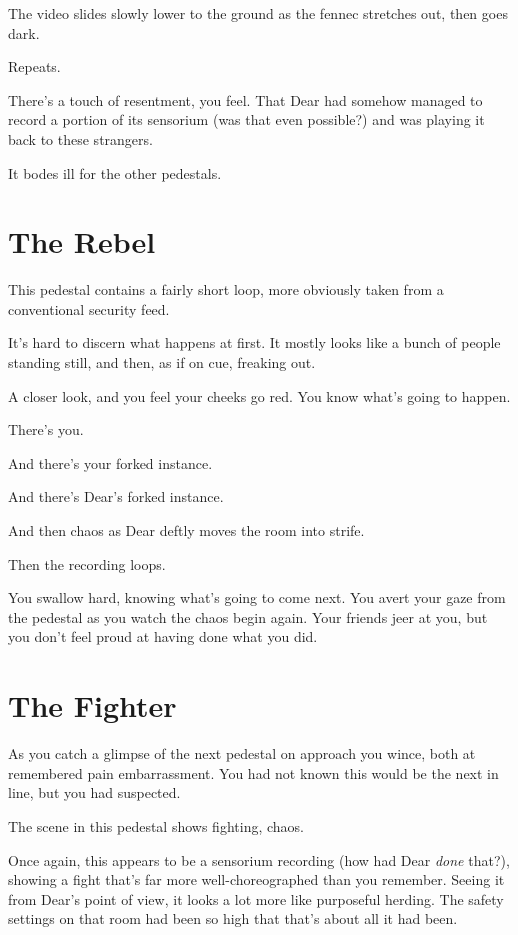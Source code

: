 The video slides slowly lower to the ground as the fennec stretches out, then goes dark.

Repeats.

There's a touch of resentment, you feel. That Dear had somehow managed to record a portion of its sensorium (was that even possible?) and was playing it back to these strangers.

It bodes ill for the other pedestals.

\newpage
\section*{The Rebel}

This pedestal contains a fairly short loop, more obviously taken from a conventional security feed.

It's hard to discern what happens at first. It mostly looks like a bunch of people standing still, and then, as if on cue, freaking out.

A closer look, and you feel your cheeks go red. You know what's going to happen.

There's you.

And there's your forked instance.

And there's Dear's forked instance.

And then chaos as Dear deftly moves the room into strife.

Then the recording loops.

You swallow hard, knowing what's going to come next. You avert your gaze from the pedestal as you watch the chaos begin again. Your friends jeer at you, but you don't feel proud at having done what you did.

\newpage
\section*{The Fighter}

As you catch a glimpse of the next pedestal on approach you wince, both at remembered pain embarrassment. You had not known this would be the next in line, but you had suspected.

The scene in this pedestal shows fighting, chaos.

Once again, this appears to be a sensorium recording (how had Dear \emph{done} that?), showing a fight that's far more well-choreographed than you remember. Seeing it from Dear's point of view, it looks a lot more like purposeful herding. The safety settings on that room had been so high that that's about all it had been.

